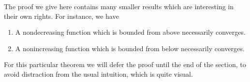 The proof we give here contains many smaller results which 
are interesting in their own rights.  For instance,
we have
\begin{enumerate}
\item A nondecreasing function which is bounded from above
      necessarily converges.
\item A nonincreasing function which is bounded from below
      necessarily converges.
\end{enumerate}

For this particular theorem we will defer the proof until the end of
the section, to avoid distraction from the
usual  intuition, which is quite visual.




